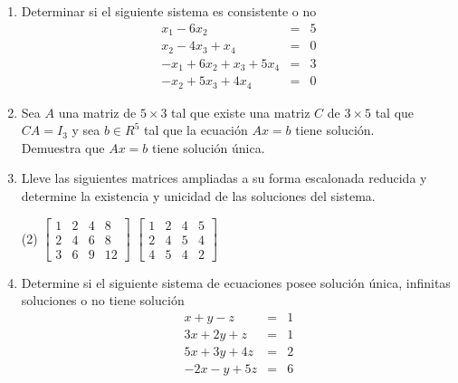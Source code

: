 \documentclass[12pt]{article}
\newenvironment{preguntas}
{\begin{enumerate}\itemsep12pt
	}
	{
	\end{enumerate}
}
\begin{document}
\begin{preguntas}
\begin{tasks}(2)
\task $
		\begin{bmatrix}
		-4 & 2 & 1 &  0\\
		2  & 1 & 2 & -1\\
		-3 & 5 &-6& -2
		\end{bmatrix}
		$
\task $
		\begin{bmatrix}
		2 & 1 & -3 & 0\\
		1  & -2 & 0 & 12\\
		4 & 2 &1& 8
		\end{bmatrix}
		$
\end{tasks}
\item Determinar si el siguiente sistema es consistente o no
	$$
	\begin{array}{rcr}
	x_1 -6x_2& = & 5\\
	x_2-4x_3+x_4& = & 0\\
	-x_1+6x_2+x_3+5x_4& = & 3\\
	-x_2+5x_3+4x_4 & = & 0
	\end{array}
	$$
\item Sea $A$ una matriz de $5 \times 3$ tal que existe una matriz $C$ de $3 \times 5$ tal que $CA = I_3$ y sea $b \in R^5$ tal que la ecuación $Ax = b$ tiene solución.\\
Demuestra que $Ax = b$ tiene solución única.
\item Lleve las siguientes matrices ampliadas a su forma escalonada reducida y determine la existencia y unicidad de las soluciones del sistema.
\begin{tasks}(2)
\task $
		\begin{bmatrix}
		1 & 2 & 4 & 8\\
		2 & 4 & 6 & 8\\
		3 & 6 & 9 & 12
		\end{bmatrix}
		$
\task $
		\begin{bmatrix}
		1 & 2 & 4 & 5\\
		2 & 4 & 5& 4\\
		4 & 5 & 4 & 2
		\end{bmatrix}
		$
\end{tasks}
\item Determine si el siguiente sistema de ecuaciones posee solución única, infinitas soluciones o no tiene solución
	$$
	\begin{array}{rcr}
	x+y-z& = & 1\\
	3x+2y+z& = & 1\\
	5x+3y+4z& = & 2\\
	-2x -y +5z & = & 6
	\end{array}$$

\end{preguntas}
\end{document}
